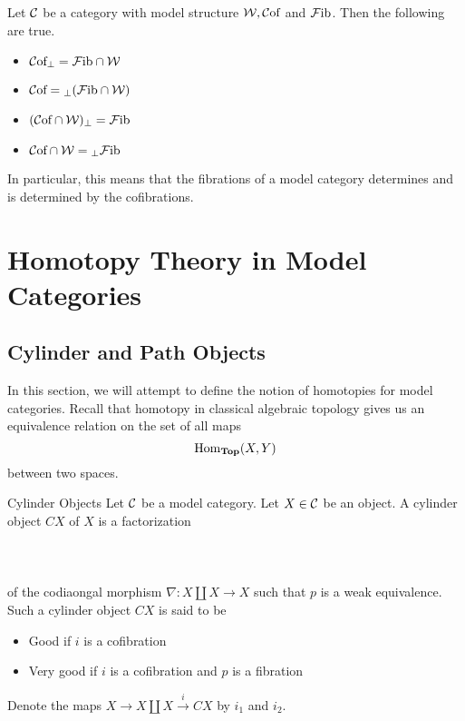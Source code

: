 \documentclass[a4paper]{article}
\begin{document}
\begin{thm}{}{} Let $\mathcal{C}$ be a category with model structure $\mathcal{W},\mathcal{C}\text{of}$ and $\mathcal{F}\text{ib}$. Then the following are true. 
\begin{itemize}
\item $\mathcal{C}\text{of}_\perp=\mathcal{F}\text{ib}\cap\mathcal{W}$
\item $\mathcal{C}\text{of}={_\perp(\mathcal{F}\text{ib}\cap\mathcal{W})}$
\item $(\mathcal{C}\text{of}\cap\mathcal{W})_\perp=\mathcal{F}\text{ib}$
\item $\mathcal{C}\text{of}\cap\mathcal{W}={_\perp\mathcal{F}\text{ib}}$
\end{itemize}
In particular, this means that the fibrations of a model category determines and is determined by the cofibrations. 
\end{thm}

\pagebreak
\section{Homotopy Theory in Model Categories}
\subsection{Cylinder and Path Objects}
In this section, we will attempt to define the notion of homotopies for model categories. Recall that homotopy in classical algebraic topology gives us an equivalence relation on the set of all maps $$\operatorname{Hom}_{\bold{Top}}(X,Y)$$ between two spaces. 

\begin{defn}{Cylinder Objects}{} Let $\mathcal{C}$ be a model category. Let $X\in\mathcal{C}$ be an object. A cylinder object $CX$ of $X$ is a factorization \\~\\
\\~\\
of the codiaongal morphism $\nabla:X\coprod X\to X$ such that $p$ is a weak equivalence. Such a cylinder object $CX$ is said to be 
\begin{itemize}
\item Good if $i$ is a cofibration
\item Very good if $i$ is a cofibration and $p$ is a fibration
\end{itemize}
Denote the maps $X\to X\coprod X\overset{i}{\longrightarrow}CX$ by $i_1$ and $i_2$. 
\end{defn}
\end{document}
